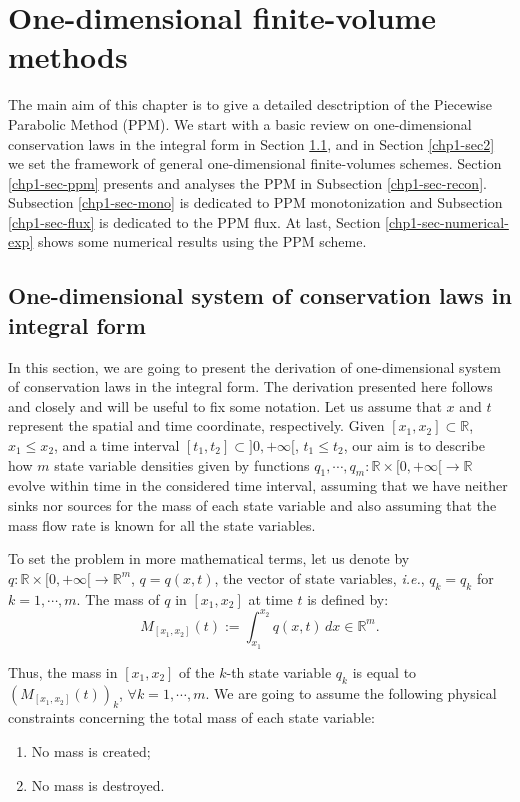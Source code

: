 \chapter{One-dimensional finite-volume methods}
\label{chp1-1d-fv}
The main aim of this chapter is to give a detailed desctription of
the Piecewise Parabolic Method (PPM).
We start with a basic review on one-dimensional conservation laws in
the integral form in Section \ref{chp1-sec1}, 
and in Section \ref{chp1-sec2} we set the framework of
general one-dimensional finite-volumes schemes.
Section \ref{chp1-sec-ppm} presents and analyses the PPM in Subsection \ref{chp1-sec-recon}.
Subsection \ref{chp1-sec-mono} is dedicated to PPM monotonization
and Subsection \ref{chp1-sec-flux} is dedicated to the PPM flux.
At last, Section \ref{chp1-sec-numerical-exp} shows some numerical results using the PPM scheme.

\section{One-dimensional system of conservation laws in integral form}
\label{chp1-sec1}
In this section, we are going to present the derivation of one-dimensional 
system of conservation laws in the integral form. 
The derivation presented here follows \citet{leveque:1990} and \citet{leveque:2002} closely and will
be useful to fix some notation. 
Let us assume that $x$ and $t$ represent the spatial and time coordinate, respectively.
Given $[x_1, x_2] \subset \mathbb{R}$, $x_1 \leq x_2$, and a time 
interval $[t_1, t_2] \subset ]0, +\infty[$, $t_1 \leq t_2$, 
our aim is to describe how $m$ state variable densities given by functions 
$q_1, \cdots, q_m: \mathbb{R}\times[0, +\infty[ \to \mathbb{R}$ 
evolve within time in the considered time interval, assuming that we have neither sinks nor sources 
for the mass of each state variable and also assuming that the mass
flow rate is known for all the state variables.

To set the problem in more mathematical terms, let us denote by 
${q}: \mathbb{R}\times [0, +\infty[\to \mathbb{R}^m$, 
${q} = {q}(x,t)$, the vector of state variables,
\textit{i.e.}, ${q}_k = q_k$ for $k=1, \cdots, m$.
The mass of ${q}$ in $[x_1, x_2]$ at time $t$ is defined by:
\begin{equation}
	\label{chp1-sec1-eq1}
	{M}_{[x_1, x_2]}(t) := \int_{x_1}^{x_2} {q}(x,t) \,dx \in \mathbb{R}^m.
\end{equation}

Thus, the mass in $[x_1, x_2]$ of the $k$-th state variable $q_k$ is equal to
$({M}_{[x_1, x_2]}(t))_k$, $\forall k = 1, \cdots, m$.
We are going to assume the following physical constraints concerning the total mass of each state variable:
\begin{enumerate}
	\item No mass is created;
	\item No mass is destroyed.
\end{enumerate}


